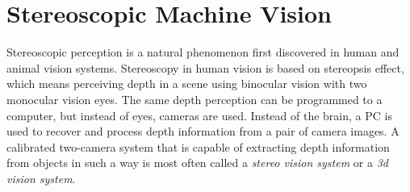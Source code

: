\documentclass[12pt,a4paper,oneside,pdftex]{report}
\begin{document}




\chapter{Stereoscopic Machine Vision}
\label{chapter:stereoscopic_machine_vision}
Stereoscopic perception is a natural phenomenon first discovered in human and animal vision systems. Stereoscopy in human vision is based on stereopsis effect, which means perceiving depth in a scene using binocular vision with two monocular vision eyes. The same depth perception can be programmed to a computer, but instead of eyes, cameras are used. Instead of the brain, a PC is used to recover and process depth information from a pair of camera images. A calibrated two-camera system that is capable of extracting depth information from objects in such a way is most often called a \emph{stereo vision system} or a \emph{3d vision system}.
\end{document}
